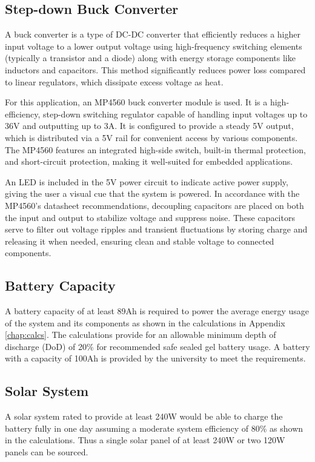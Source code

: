 \subsection{Step-down Buck Converter}

A buck converter is a type of DC-DC converter that efficiently reduces a higher input voltage to a lower output voltage using high-frequency switching elements (typically a transistor and a diode) along with energy storage components like inductors and capacitors. This method significantly reduces power loss compared to linear regulators, which dissipate excess voltage as heat.

For this application, an MP4560 buck converter module is used. It is a high-efficiency, step-down switching regulator capable of handling input voltages up to 36V and outputting up to 3A. It is configured to provide a steady 5V output, which is distributed via a 5V rail for convenient access by various components. The MP4560 features an integrated high-side switch, built-in thermal protection, and short-circuit protection, making it well-suited for embedded applications.

An LED is included in the 5V power circuit to indicate active power supply, giving the user a visual cue that the system is powered. In accordance with the MP4560’s datasheet recommendations, decoupling capacitors are placed on both the input and output to stabilize voltage and suppress noise. These capacitors serve to filter out voltage ripples and transient fluctuations by storing charge and releasing it when needed, ensuring clean and stable voltage to connected components.

\subsection{Battery Capacity}

A battery capacity of at least 89Ah is required to power the average energy usage of the system and its components as shown in the calculations in Appendix \ref{chap:calcs}. The calculations provide for an allowable minimum depth of discharge (DoD) of 20\% for recommended safe sealed gel battery usage. A battery with a capacity of 100Ah is provided by the university to meet the requirements.

\subsection{Solar System}

A solar system rated to provide at least 240W would be able to charge the battery fully in one day assuming a moderate system efficiency of 80\% as shown in the calculations. Thus a single solar panel of at least 240W or two 120W panels can be sourced. 

